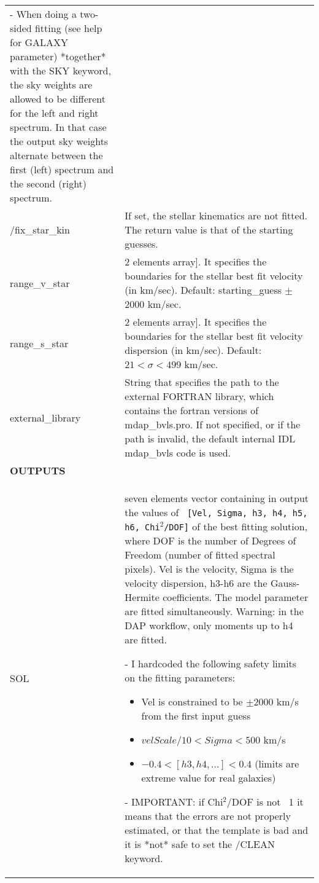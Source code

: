 \begin{center}
\begin{longtable}{p{2.7cm}| p{11.1cm}}
       - When doing a two-sided fitting (see help for GALAXY parameter) *together*
       with the SKY keyword, the sky weights are allowed to be different for the
       left and right spectrum. In that case the output sky weights alternate
       between the first (left) spectrum and the second (right) spectrum.\\
%
/fix\_star\_kin &        If set, the stellar kinematics are not
                       fitted. The return value is that of the starting guesses.\\ 
%
range\_v\_star & 2 elements array]. It specifies the boundaries for the stellar best 
           fit velocity (in km/sec). Default: starting\_guess $\pm$ 2000 km/sec.\\
%
range\_s\_star &  2 elements array]. It specifies the boundaries for the stellar best fit 
     velocity dispersion (in km/sec). Default: $21 < \sigma < 499$ km/sec.\\
%
external\_library & String that specifies the path to the external FORTRAN library, which 
                  contains the fortran versions of mdap\_bvls.pro. 
                  If not specified, or if the path is invalid, the default internal IDL mdap\_bvls code is used. \\
\hline
{\bf  OUTPUTS} &  \\
\hline
  SOL & seven elements vector containing in output the values of {\tt
     [Vel, Sigma, h3, h4, h5, h6, Chi$^2$/DOF]} of the best fitting
     solution, where DOF is the number of Degrees of Freedom (number of
     fitted spectral pixels).  Vel is the velocity, Sigma is the
     velocity dispersion, h3-h6 are the Gauss-Hermite coefficients. The
     model parameter are fitted simultaneously.  Warning: in the DAP
     workflow, only moments up to h4 are fitted.

    \smallskip

     - I hardcoded the following safety limits on the fitting parameters:
     \begin{itemize}
         \item Vel is constrained to be $\pm$2000 km/s from the first input guess
         \item  $velScale/10 < Sigma < 500$ km/s
         \item  $-0.4 < [h3 ,h4, ...] < 0.4$ (limits are extreme value for real galaxies)
         \end{itemize}
    \smallskip

     - IMPORTANT: if Chi$^2$/DOF is not ~1 it means that the errors are not
       properly estimated, or that the template is bad and it is *not* safe
       to set the /CLEAN keyword.


\end{longtable}
\end{center}
